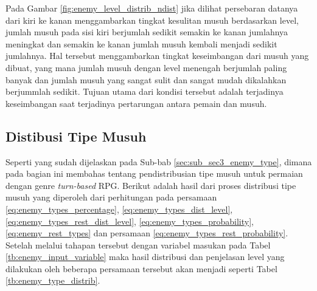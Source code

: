 Pada Gambar \ref{fig:enemy_level_distrib_ndist} jika dilihat persebaran datanya dari kiri ke kanan menggambarkan tingkat kesulitan musuh berdasarkan level, jumlah musuh pada sisi kiri berjumlah sedikit semakin ke kanan jumlahnya meningkat dan semakin ke kanan jumlah musuh kembali menjadi sedikit jumlahnya. Hal tersebut menggambarkan tingkat keseimbangan dari musuh yang dibuat, yang mana jumlah musuh dengan level menengah berjumlah paling banyak dan jumlah musuh yang sangat sulit dan sangat mudah dikalahkan berjummlah sedikit. Tujuan utama dari kondisi tersebut adalah terjadinya keseimbangan saat terjadinya pertarungan antara pemain dan musuh.
\vspace{1ex}


\subsection{Distibusi Tipe Musuh}
\label{sec:sub_sec4_eval_dist_enemy_type}
\vspace{1ex}

Seperti yang sudah dijelaskan pada Sub-bab \ref{sec:sub_sec3_enemy_type}, dimana pada bagian ini membahas tentang pendistribusian tipe musuh untuk permaian dengan genre \textit{turn-based} RPG. Berikut adalah hasil dari proses distribusi tipe musuh yang diperoleh dari perhitungan pada persamaan \ref{eq:enemy_types_percentage}, \ref{eq:enemy_types_dist_level}, \ref{eq:enemy_types_rest_dist_level}, \ref{eq:enemy_types_probability}, \ref{eq:enemy_rest_types} dan persamaan \ref{eq:enemy_types_rest_probability}. Setelah melalui tahapan tersebut dengan variabel masukan pada Tabel \ref{tb:enemy_input_variable} maka hasil distribusi dan penjelasan level yang dilakukan oleh beberapa persamaan tersebut akan menjadi seperti Tabel \ref{tb:enemy_type_distrib}.


